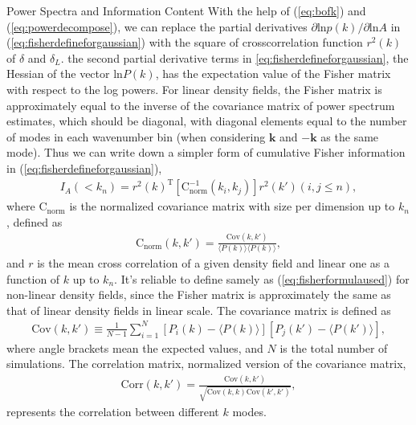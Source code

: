 \begin{section}{Power Spectra and Information Content}
   With the help of (\ref{eq:bofk}) and (\ref{eq:powerdecompose}), we can replace the partial derivatives 
$\partial \mathrm{ln} p(k) / \partial \mathrm{ln} A$ in (\ref{eq:fisherdefineforgaussian}) with the square of 
crosscorrelation function $r ^2 (k)$ of $\delta$ and $\delta_L$. the second partial derivative terms in 
\ref{eq:fisherdefineforgaussian}, the Hessian of the vector $\mathrm{ln} P(k)$, has the expectation 
value of the Fisher matrix with respect to the log powers. For linear density fields, the Fisher matrix is 
approximately equal to the inverse of the covariance matrix of power spectrum estimates, which should be diagonal, 
with diagonal elements equal to the number of modes in each wavenumber bin (when considering $\bm{k}$ and $-\bm{k}$ 
as the same mode). Thus we can write down a simpler form of cumulative Fisher information in (\ref{eq:fisherdefineforgaussian}), 
\begin{align}
    I_A \left( < k_n\right) = r^2(k)^{\mathrm{T}} \left[ \mathrm{C^{-1}_{norm}} ( k_i,k_j )\right] r^2(k')( i,j \leq n ) ,
\label{eq:fisherformulaused}
\end{align}
where $\mathrm{C_{norm}}$ is the normalized covariance matrix with size per dimension up to $k_n$, defined as
\begin{align}
    \mathrm{C_{norm}} \left( k,k' \right)=\frac{\mathrm{Cov}(k,k')}{\langle P(k)\rangle\langle P(k)\rangle},
\end{align}
and $r$ is the mean cross correlation of a given density field and linear one as a function of $k$ up to $k_n$. 
It's reliable to define samely as (\ref{eq:fisherformulaused}) for non-linear density fields, 
since the Fisher matrix is approximately the same as that of linear density fields in linear scale. 
The covariance matrix is defined as 
\begin{align}
    \mathrm{Cov}\left(k,k'\right)\equiv \frac{1}{N-1}\sum_{i=1}^{N}\left[ P_i \left( k \right) - 
\langle P \left( k \right) \rangle \right]\left[ P_j \left( k' \right) - \langle P \left( k' \right)\rangle \right],
\end{align}
where angle brackets mean the expected values, and $N$ is the total number of simulations.
    The  correlation matrix, normalized version of the covariance matrix,
\begin{align}
    \mathrm{Corr}\left(k,k'\right)=\frac{\mathrm{Cov}\left(k,k'\right)}{\sqrt{\mathrm{Cov}\left(k,k\right)\mathrm{Cov}\left(k',k'\right)}},
\end{align}
represents the correlation between different $k$ modes. 

\end{section}
